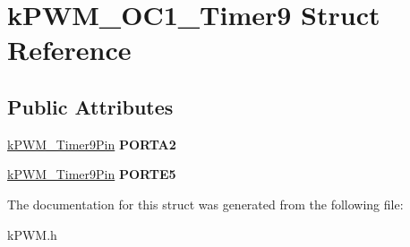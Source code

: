 \hypertarget{structkPWM__OC1__Timer9}{}\section{k\+P\+W\+M\+\_\+\+O\+C1\+\_\+\+Timer9 Struct Reference}
\label{structkPWM__OC1__Timer9}
\subsection*{Public Attributes}
\begin{DoxyCompactItemize}
\item 
\hyperlink{structkPWM__Timer9Pin}{k\+P\+W\+M\+\_\+\+Timer9\+Pin} {\bfseries P\+O\+R\+T\+A2}\hypertarget{structkPWM__OC1__Timer9_ad886508647968f6b905d89da39a17007}{}\label{structkPWM__OC1__Timer9_ad886508647968f6b905d89da39a17007}

\item 
\hyperlink{structkPWM__Timer9Pin}{k\+P\+W\+M\+\_\+\+Timer9\+Pin} {\bfseries P\+O\+R\+T\+E5}\hypertarget{structkPWM__OC1__Timer9_a7910ac894a5c9d1568c0347442fb6236}{}\label{structkPWM__OC1__Timer9_a7910ac894a5c9d1568c0347442fb6236}

\end{DoxyCompactItemize}


The documentation for this struct was generated from the following file\+:\begin{DoxyCompactItemize}
\item 
k\+P\+W\+M.\+h\end{DoxyCompactItemize}
